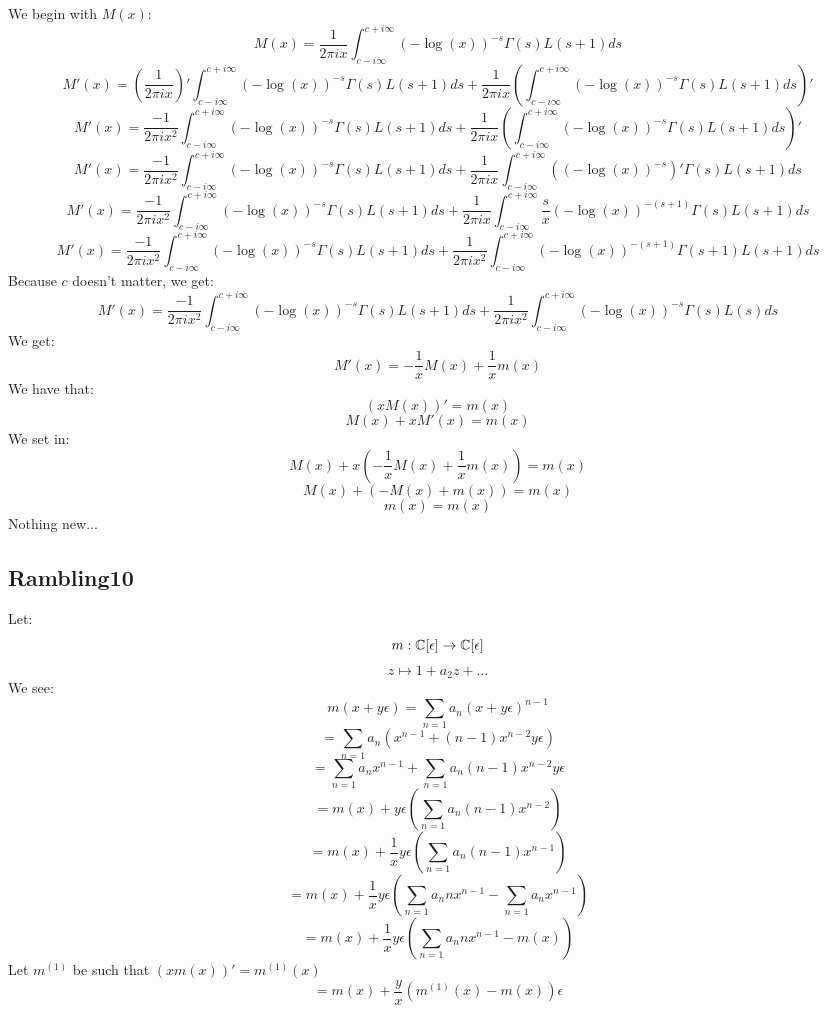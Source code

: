\documentclass[a4paper]{amsart}
\begin{document}
We begin with $M(x)$:
$$M(x) = \frac{1}{2\pi i x} \int_{c - i\infty}^{c + i\infty}(-\log(x))^{-s} \Gamma(s)L(s + 1)ds$$
$$M'(x) = \left(\frac{1}{2\pi i x}\right)' \int_{c - i\infty}^{c + i\infty}(-\log(x))^{-s} \Gamma(s)L(s + 1)ds + \frac{1}{2\pi i x} \left(\int_{c - i\infty}^{c + i\infty}(-\log(x))^{-s} \Gamma(s)L(s + 1)ds\right)'$$
$$M'(x) = \frac{-1}{2\pi i x^2} \int_{c - i\infty}^{c + i\infty}(-\log(x))^{-s} \Gamma(s)L(s + 1)ds + \frac{1}{2\pi i x} \left(\int_{c - i\infty}^{c + i\infty}(-\log(x))^{-s} \Gamma(s)L(s + 1)ds\right)'$$
$$M'(x) = \frac{-1}{2\pi i x^2} \int_{c - i\infty}^{c + i\infty}(-\log(x))^{-s} \Gamma(s)L(s + 1)ds + \frac{1}{2\pi i x} \int_{c - i\infty}^{c + i\infty}\left((-\log(x))^{-s}\right)' \Gamma(s)L(s + 1)ds$$
$$M'(x) = \frac{-1}{2\pi i x^2} \int_{c - i\infty}^{c + i\infty}(-\log(x))^{-s} \Gamma(s)L(s + 1)ds + \frac{1}{2\pi i x} \int_{c - i\infty}^{c + i\infty}\frac{s}{x}(-\log(x))^{-(s + 1)} \Gamma(s)L(s + 1)ds$$
$$M'(x) = \frac{-1}{2\pi i x^2} \int_{c - i\infty}^{c + i\infty}(-\log(x))^{-s} \Gamma(s)L(s + 1)ds + \frac{1}{2\pi i x^2} \int_{c - i\infty}^{c + i\infty}(-\log(x))^{-(s + 1)} \Gamma(s + 1)L(s + 1)ds$$
Because $c$ doesn't matter, we get:
$$M'(x) = \frac{-1}{2\pi i x^2} \int_{c - i\infty}^{c + i\infty}(-\log(x))^{-s} \Gamma(s)L(s + 1)ds + \frac{1}{2\pi i x^2} \int_{c - i\infty}^{c + i\infty}(-\log(x))^{-s} \Gamma(s)L(s)ds$$
We get:
$$M'(x) = -\frac{1}{x} M(x) + \frac{1}{x}m(x)$$
We have that: 
$$(xM(x))' = m(x)$$
$$M(x) + xM'(x) = m(x)$$
We set in:
$$M(x) + x\left(-\frac{1}{x} M(x) + \frac{1}{x}m(x)\right) = m(x)$$
$$M(x) + (-M(x) + m(x)) = m(x)$$
$$m(x) = m(x)$$
Nothing new...

\subsection{Rambling10}

Let:
$$m : \mathbb{C}[\epsilon] \to \mathbb{C}[\epsilon]$$
$$z \mapsto 1 + a_2z + \ldots$$
We see: 
$$m(x + y\epsilon) = \sum_{n = 1} a_n (x + y\epsilon)^{n - 1}$$
$$ = \sum_{n = 1} a_n (x^{n - 1} + (n - 1)x^{n - 2}y\epsilon)$$
$$ = \sum_{n = 1} a_n x^{n - 1} + \sum_{n = 1} a_n (n - 1)x^{n - 2}y\epsilon$$
$$ = m(x) + y\epsilon(\sum_{n = 1} a_n (n - 1)x^{n - 2})$$
$$ = m(x) + \frac{1}{x}y\epsilon(\sum_{n = 1} a_n (n - 1)x^{n - 1})$$
$$ = m(x) + \frac{1}{x}y\epsilon(\sum_{n = 1} a_n n x^{n - 1} - \sum_{n = 1} a_n x^{n - 1})$$
$$ = m(x) + \frac{1}{x}y\epsilon(\sum_{n = 1} a_n n x^{n - 1} - m(x))$$
Let $m^{(1)}$ be such that $(xm(x))' = m^{(1)}(x)$
$$ = m(x) + \frac{y}{x}\left(m^{(1)}(x) - m(x)\right)\epsilon$$
\end{document}
